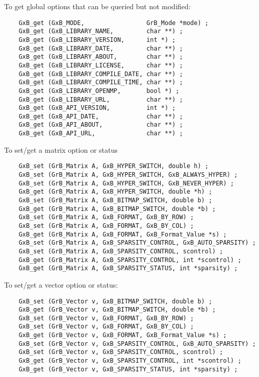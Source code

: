 \documentclass[12pt]{article}
\begin{document}
\noindent
To get global options that can be queried but not modified:

    {\footnotesize
    \begin{verbatim}
    GxB_get (GxB_MODE,                 GrB_Mode *mode) ;
    GxB_get (GxB_LIBRARY_NAME,         char **) ;
    GxB_get (GxB_LIBRARY_VERSION,      int *) ;
    GxB_get (GxB_LIBRARY_DATE,         char **) ;
    GxB_get (GxB_LIBRARY_ABOUT,        char **) ;
    GxB_get (GxB_LIBRARY_LICENSE,      char **) ;
    GxB_get (GxB_LIBRARY_COMPILE_DATE, char **) ;
    GxB_get (GxB_LIBRARY_COMPILE_TIME, char **) ;
    GxB_get (GxB_LIBRARY_OPENMP,       bool *) ;
    GxB_get (GxB_LIBRARY_URL,          char **) ;
    GxB_get (GxB_API_VERSION,          int *) ;
    GxB_get (GxB_API_DATE,             char **) ;
    GxB_get (GxB_API_ABOUT,            char **) ;
    GxB_get (GxB_API_URL,              char **) ; \end{verbatim} }

\noindent
To set/get a matrix option or status

    {\footnotesize
    \begin{verbatim}
    GxB_set (GrB_Matrix A, GxB_HYPER_SWITCH, double h) ;
    GxB_set (GrB_Matrix A, GxB_HYPER_SWITCH, GxB_ALWAYS_HYPER) ;
    GxB_set (GrB_Matrix A, GxB_HYPER_SWITCH, GxB_NEVER_HYPER) ;
    GxB_get (GrB_Matrix A, GxB_HYPER_SWITCH, double *h) ;
    GxB_set (GrB_Matrix A, GxB_BITMAP_SWITCH, double b) ;
    GxB_get (GrB_Matrix A, GxB_BITMAP_SWITCH, double *b) ;
    GxB_set (GrB_Matrix A, GxB_FORMAT, GxB_BY_ROW) ;
    GxB_set (GrB_Matrix A, GxB_FORMAT, GxB_BY_COL) ;
    GxB_get (GrB_Matrix A, GxB_FORMAT, GxB_Format_Value *s) ;
    GxB_set (GrB_Matrix A, GxB_SPARSITY_CONTROL, GxB_AUTO_SPARSITY) ;
    GxB_set (GrB_Matrix A, GxB_SPARSITY_CONTROL, scontrol) ;
    GxB_get (GrB_Matrix A, GxB_SPARSITY_CONTROL, int *scontrol) ;
    GxB_get (GrB_Matrix A, GxB_SPARSITY_STATUS, int *sparsity) ; \end{verbatim} }

\noindent
To set/get a vector option or status:

    {\footnotesize
    \begin{verbatim}
    GxB_set (GrB_Vector v, GxB_BITMAP_SWITCH, double b) ;
    GxB_get (GrB_Vector v, GxB_BITMAP_SWITCH, double *b) ;
    GxB_set (GrB_Vector v, GxB_FORMAT, GxB_BY_ROW) ;
    GxB_set (GrB_Vector v, GxB_FORMAT, GxB_BY_COL) ;
    GxB_get (GrB_Vector v, GxB_FORMAT, GxB_Format_Value *s) ;
    GxB_set (GrB_Vector v, GxB_SPARSITY_CONTROL, GxB_AUTO_SPARSITY) ;
    GxB_set (GrB_Vector v, GxB_SPARSITY_CONTROL, scontrol) ;
    GxB_get (GrB_Vector v, GxB_SPARSITY_CONTROL, int *scontrol) ;
    GxB_get (GrB_Vector v, GxB_SPARSITY_STATUS, int *sparsity) ; \end{verbatim} }
\end{document}

